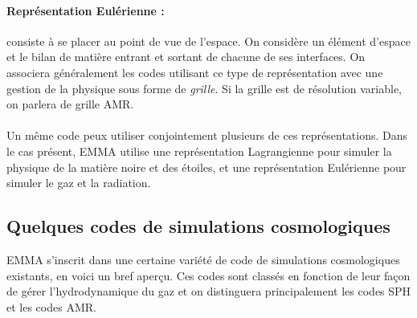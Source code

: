 
\paragraph{Représentation Eulérienne : } 
consiste à se placer au point de vue de l'espace.
On considère un élément d'espace et le bilan de matière entrant et sortant de chacune de ses interfaces.
On associera généralement les codes utilisant ce type de représentation avec une gestion de la physique sous forme de \emph{grille}.
Si la grille est de résolution variable, on parlera de grille \ac{AMR}.


\paragraph{}

Un même code peux utiliser conjointement plusieurs de ces représentations.
Dans le cas présent, EMMA utilise une représentation Lagrangienne pour simuler la physique de la matière noire et des étoiles, et une représentation Eulérienne pour simuler le gaz et la radiation.

\subsection{Quelques codes de simulations cosmologiques}

EMMA s'inscrit dans une certaine variété de code de simulations cosmologiques existants, en voici un bref aperçu.
Ces codes sont classés en fonction de leur façon de gérer l'hydrodynamique du gaz et on distinguera principalement les codes \ac{SPH} et les codes \ac{AMR}.

